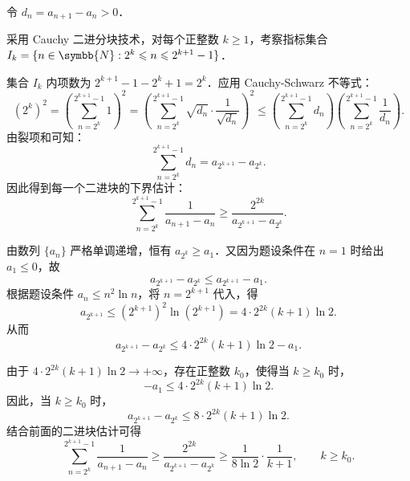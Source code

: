 \begin{myproof}
    令 $d_n = a_{n+1} - a_n > 0$．

    采用 Cauchy 二进分块技术，对每个正整数 $k \geqslant 1$，考察指标集合 $I_k = \{n \in \symbb{N} : 2^k \leqslant n \leqslant 2^{k+1} - 1\}$．

    集合 $I_k$ 内项数为 $2^{k+1} - 1 - 2^k + 1 = 2^k$．应用 Cauchy-Schwarz 不等式：
    \begin{equation}
        (2^k)^2 = \left( \sum_{n=2^k}^{2^{k+1}-1} 1 \right)^2 = \left( \sum_{n=2^k}^{2^{k+1}-1} \sqrt{d_n} \cdot \frac{1}{\sqrt{d_n}} \right)^2 \leqslant \left( \sum_{n=2^k}^{2^{k+1}-1} d_n \right) \left( \sum_{n=2^k}^{2^{k+1}-1} \frac{1}{d_n} \right).
    \end{equation}
    由裂项和可知：
    \begin{equation}
        \sum_{n=2^k}^{2^{k+1}-1} d_n = a_{2^{k+1}} - a_{2^k}.
    \end{equation}
    因此得到每一个二进块的下界估计：
    \begin{equation}
        \sum_{n=2^k}^{2^{k+1}-1} \frac{1}{a_{n+1} - a_n}
        \geqslant \frac{2^{2k}}{a_{2^{k+1}} - a_{2^k}}.
    \end{equation}

    由数列 $\{a_n\}$ 严格单调递增，恒有 $a_{2^k} \geqslant a_1$．又因为题设条件在 $n=1$ 时给出 $a_1 \leqslant 0$，故
    \begin{equation}
        a_{2^{k+1}} - a_{2^k} \leqslant a_{2^{k+1}} - a_1.
    \end{equation}
    根据题设条件 $a_n \leqslant n^2 \ln n$，将 $n = 2^{k+1}$ 代入，得
    \begin{equation}
        a_{2^{k+1}} \leqslant (2^{k+1})^2 \ln(2^{k+1}) = 4 \cdot 2^{2k} (k+1) \ln 2.
    \end{equation}
    从而
    \begin{equation}
        a_{2^{k+1}} - a_{2^k}
        \leqslant 4 \cdot 2^{2k} (k+1) \ln 2 - a_1.
    \end{equation}

    由于 $4 \cdot 2^{2k} (k+1) \ln 2 \to +\infty$，存在正整数 $k_0$，使得当 $k \geqslant k_0$ 时，
    \begin{equation}
        -a_1 \leqslant 4 \cdot 2^{2k} (k+1) \ln 2.
    \end{equation}
    因此，当 $k \geqslant k_0$ 时，
    \begin{equation}
        a_{2^{k+1}} - a_{2^k}
        \leqslant 8 \cdot 2^{2k} (k+1) \ln 2.
    \end{equation}
    结合前面的二进块估计可得
    \begin{equation}
        \sum_{n=2^k}^{2^{k+1}-1} \frac{1}{a_{n+1} - a_n}
        \geqslant \frac{2^{2k}}{a_{2^{k+1}} - a_{2^k}}
        \geqslant \frac{1}{8\ln 2} \cdot \frac{1}{k+1},
        \qquad k \geqslant k_0.
    \end{equation}


\end{myproof}
